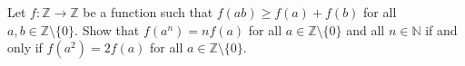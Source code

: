 \documentclass[varwidth]{standalone}
\begin{document}
    Let $f: \mathbb{Z} \to \mathbb{Z}$ be a function such that $f(ab) \geq f(a) + f(b)$ for all $a, b \in \mathbb{Z} \setminus \{0\}$. Show that $f\left( a^n \right) = nf(a)$ for all $a \in \mathbb{Z} \setminus \{0\}$ and all $n \in \mathbb{N}$ if and only if $f\left( a^2 \right) = 2f(a)$ for all $a \in \mathbb{Z} \setminus \{0\}$.
\end{document}

